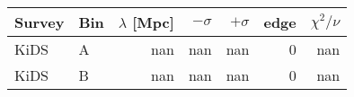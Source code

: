 \begin{longtable}{llrrrrr}
\toprule
Survey & Bin & $\lambda$ [Mpc] & $-\sigma$ & $+\sigma$ & edge & $\chi^2/\nu$\\\midrule
KiDS & A & nan & nan & nan & 0 & nan\\
KiDS & B & nan & nan & nan & 0 & nan\\
\bottomrule
\end{longtable}
